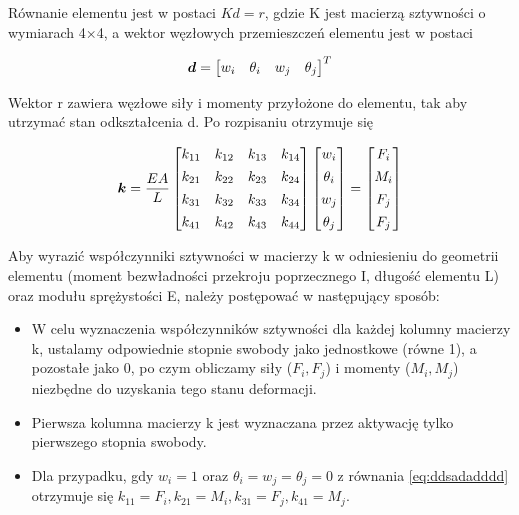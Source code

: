 Równanie elementu jest w postaci $Kd = r$, gdzie K jest macierzą sztywności o wymiarach 4×4, a wektor węzłowych przemieszczeń elementu jest w postaci

\begin{equation}
\label{eq:ddsadadddd}
\boldsymbol{d} =
    \begin{bmatrix}
        w_i & \theta_i & w_j & \theta_j
    \end{bmatrix}^T
\end{equation}

Wektor r zawiera węzłowe siły i momenty przyłożone do elementu, tak aby utrzymać stan odkształcenia d.
Po rozpisaniu otrzymuje się

\begin{equation}
\label{eq:adadssadsssad}
\boldsymbol{k} =
    \frac{EA}{L}
    \begin{bmatrix}
        k_{11} & k_{12} & k_{13} & k_{14} \\[1ex]
        k_{21} & k_{22} & k_{23} & k_{24} \\[1ex]
        k_{31} & k_{32} & k_{33} & k_{34} \\[1ex]
        k_{41} & k_{42} & k_{43} & k_{44} \\
    \end{bmatrix}
    \begin{bmatrix}
        w_i \\[1ex]
        \theta_i \\[1ex]
        w_j \\[1ex]
        \theta_j \\
    \end{bmatrix}
    =
    \begin{bmatrix}
        F_i \\[1ex]
        M_i \\[1ex]
        F_j \\[1ex]
        F_j \\
    \end{bmatrix}
\end{equation}

Aby wyrazić współczynniki sztywności w macierzy k w odniesieniu do geometrii elementu (moment bezwładności przekroju poprzecznego I, długość elementu L) oraz modułu sprężystości E, należy postępować w następujący sposób:

\begin{itemize}
    \item W celu wyznaczenia współczynników sztywności dla każdej kolumny macierzy k, ustalamy odpowiednie stopnie swobody jako jednostkowe (równe 1), a pozostałe jako 0, po czym obliczamy siły ($F_i, F_j$) i momenty ($M_i, M_j$) niezbędne do uzyskania tego stanu deformacji.
    \item Pierwsza kolumna macierzy k jest wyznaczana przez aktywację tylko pierwszego stopnia swobody.
    \item Dla przypadku, gdy $w_i=1$ oraz $\theta_i=w_j=\theta_j=0$ z równania \ref{eq:ddsadadddd} otrzymuje się $k_{11}=F_i, k_{21}=M_i, k_{31}=F_j, k_{41}=M_j$.
\end{itemize}

